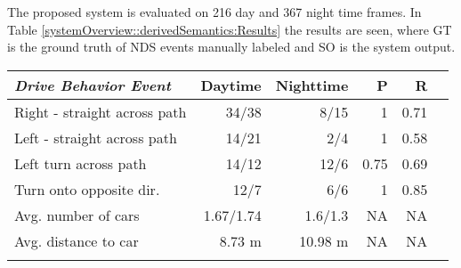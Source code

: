 The proposed system is evaluated on 216 day and 367 night time frames. In Table \ref{systemOverview::derivedSemantics:Results} the results are seen, where GT is the ground truth of NDS events manually labeled and SO is the system output.
  \begin{tabular}{l r r r r r}
   \toprule
 \textbf{\textit{Drive Behavior Event}}& \textbf{Daytime} & \textbf{Nighttime} & \textbf{P} & \textbf{R} \\
    \toprule
    Right - straight across path & 34/38 & 8/15 & 1 & 0.71  \\ 
    Left - straight across path & 14/21  &  2/4  & 1 & 0.58 \\
    Left turn across path  & 14/12 & 12/6  & 0.75 & 0.69 \\ 
    Turn onto opposite dir.  & 12/7  & 6/6  & 1 & 0.85 \\ 
    Avg. number of cars & 1.67/1.74 & 1.6/1.3 &  NA &NA  \\ 
    Avg. distance to car &  8.73 m &10.98 m &  NA& NA \\ 
    \bottomrule     
    \label{systemOverview::derivedSemantics:Results}   
  \end{tabular}
  
\vspace{5pt}